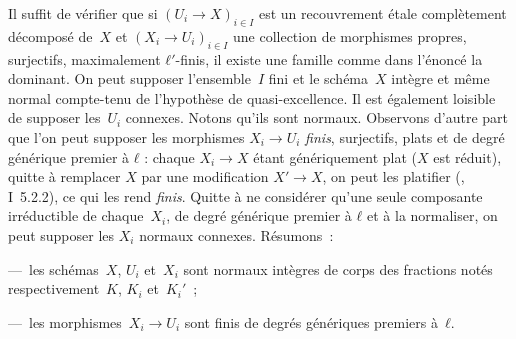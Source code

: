 \documentclass[10pt]{../fichiers-configuration-latex/smfart}
\begin{document}
\begin{démo}
Il suffit de vérifier que
si $(U_i→ X)_{i∈I}$ est un recouvrement étale complètement décomposé de $X$
et $(X_i→U_i)_{i∈I}$ une collection de morphismes propres,
surjectifs, maximalement $ℓ′$-finis, il existe une famille comme
dans l'énoncé la dominant. On peut supposer l'ensemble $I$ fini
et le schéma $X$ intègre et même normal compte-tenu
de l'hypothèse de quasi-excellence. Il est également loisible de supposer les $U_i$ connexes.
Notons qu'ils sont normaux. Observons d'autre part que l'on peut supposer les morphismes $X_i→U_i$ \emph{finis},
surjectifs, plats et de degré générique premier à $ℓ$ : chaque $X_i→X$ étant
génériquement plat ($X$ est réduit), quitte à remplacer $X$ par une
modification $X'→X$, on peut les platifier (\cite{Platification@Raynaud-Gruson},
 I 5.2.2), ce qui les rend \emph{finis}.
Quitte à ne considérer qu'une seule composante irréductible de chaque $X_i$,
de degré générique premier à $ℓ$ et à la normaliser,
on peut supposer les $X_i$ normaux connexes.
Résumons :

— les schémas $X$, $U_i$ et $X_i$ sont normaux intègres
de corps des fractions notés respectivement $K$, $K_i$
et $K_i′$ ;

— les morphismes $X_i → U_i$ sont finis de degrés
génériques premiers à $ℓ$.


\end{démo}
\end{document}
